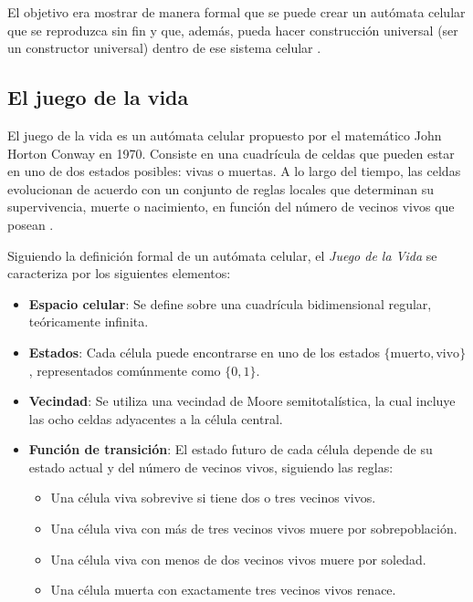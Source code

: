 El objetivo era mostrar de manera formal que se puede crear un autómata celular que se reproduzca sin fin y que, además, pueda hacer construcción universal (ser un constructor universal) dentro de ese sistema celular \cite{vonNeumann1966, cellularAutomatonHistory}. 

\subsection{El juego de la vida}

El juego de la vida es un autómata celular propuesto por el matemático John Horton Conway en 1970. Consiste en una cuadrícula de celdas que pueden estar en uno de dos estados posibles: vivas o muertas. A lo largo del tiempo, las celdas evolucionan de acuerdo con un conjunto de reglas locales que determinan su supervivencia, muerte o nacimiento, en función del número de vecinos vivos que posean \cite{life2}.

Siguiendo la definición formal de un autómata celular, el \textit{Juego de la Vida} se caracteriza por los siguientes elementos:

\begin{itemize}
	
	
	
	\item \textbf{Espacio celular}: Se define sobre una cuadrícula bidimensional regular, teóricamente infinita. 
	
	
	
	\item \textbf{Estados}: Cada célula puede encontrarse en uno de los estados $\{ \text{muerto}, \text{vivo} \}$, representados comúnmente como $\{0, 1\}$.
	
	
	
	\item \textbf{Vecindad}: Se utiliza una vecindad de Moore semitotalística, la cual incluye las ocho celdas adyacentes a la célula central.
	
	
	
	\item \textbf{Función de transición}: El estado futuro de cada célula depende de su estado actual y del número de vecinos vivos, siguiendo las reglas:
	
	
	
	\begin{itemize}
		
		\item Una célula viva sobrevive si tiene dos o tres vecinos vivos.  
		
		\item Una célula viva con más de tres vecinos vivos muere por sobrepoblación.  
		
		\item Una célula viva con menos de dos vecinos vivos muere por soledad.  
		
		\item Una célula muerta con exactamente tres vecinos vivos renace.  
		
	\end{itemize}
	
	
	
\end{itemize}

